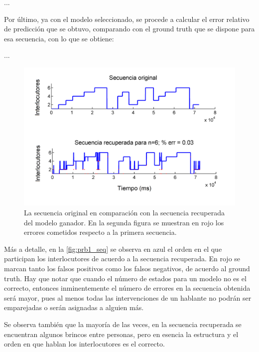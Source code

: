 ...

Por último, ya con el modelo seleccionado, se procede a calcular el error relativo de predicción que se obtuvo, comparando con el ground truth que se dispone para esa secuencia, con lo que se obtiene: 

...

\begin{figure}[bht]
  \centerline
  {\includegraphics[width=0.8\linewidth]{gfx/chap6/cuervo1_}} \quad
  \caption[Secuencia 1: Secuencia recuperada]{La secuencia original en comparación con la secuencia recuperada del modelo ganador. En la segunda figura se muestran en rojo los errores cometidos respecto a la primera secuencia. }
  \label{fig:prb1_seq}
\end{figure}

Más a detalle, en la \autoref{fig:prb1_seq} se observa en azul el orden en el que participan los interlocutores de acuerdo a la secuencia recuperada. En rojo se marcan tanto los falsos positivos como los falsos negativos, de acuerdo al ground truth. Hay que notar que cuando el número de estados para un modelo no es el correcto, entonces inminentemente el número de errores en la secuencia obtenida será mayor, pues al menos todas las intervenciones de un hablante no podrán ser emparejadas o serán asignadas a alguien más.

Se observa también que la mayoría de las veces, en la secuencia recuperada se encuentran algunos brincos entre personas, pero en esencia la estructura y el orden en que hablan los interlocutores es el correcto.


